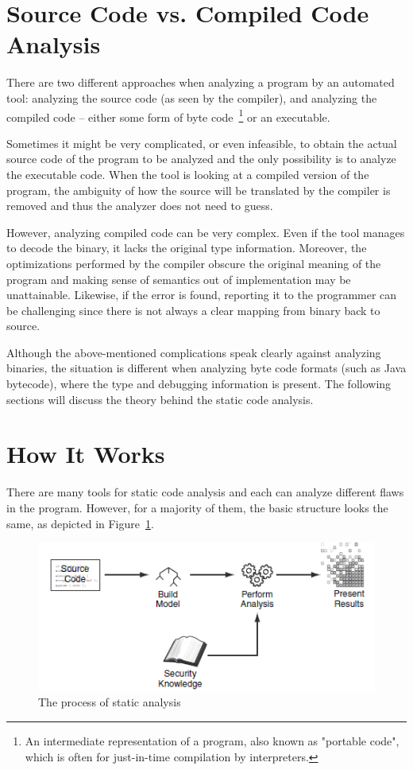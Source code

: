 \documentclass[
  digital, %
  table,   %
  lof,     %
  lot,     %
  oneside,
]{fithesis3}
\begin{document}
\section{Source Code vs. Compiled Code Analysis}
There are two different approaches when analyzing a program by an automated tool: analyzing the source code (as seen by the compiler), and analyzing the compiled code -- either some form of byte code~\footnote{An intermediate representation of a program, also known as "portable code", which is often for just-in-time compilation by interpreters.} or an executable.

Sometimes it might be very complicated, or even infeasible, to obtain the actual source code of the program to be analyzed and the only possibility is to analyze the executable code. When the tool is looking at a compiled version of the program, the ambiguity of how the source will be translated by the compiler is removed and thus the analyzer does not need to guess. 

However, analyzing compiled code can be very complex. Even if the tool manages to decode the binary, it lacks the original type information. Moreover, the optimizations performed by the compiler obscure the original meaning of the program and making sense of semantics out of implementation may be unattainable. Likewise, if the error is found, reporting it to the programmer can be challenging since there is not always a clear mapping from binary back to source. 

Although the above-mentioned complications speak clearly against analyzing binaries, the situation is different when analyzing byte code formats (such as Java bytecode), where the type and debugging information is present. The following sections will discuss the theory behind the static code analysis.

\section{How It Works}
There are many tools for static code analysis and each can analyze different flaws in the program. However, for a majority of them, the basic structure looks the same, as depicted in Figure~\ref{fig:static-code-analysis-internals}.

\begin{figure}[h!]
		\centering
			\includegraphics[scale=0.75]{img/static-code-analysis-internals}
		\caption{The process of static analysis~\cite{secure-programming-sca}}
		\label{fig:static-code-analysis-internals}
\end{figure}
\end{document}
